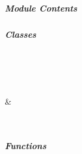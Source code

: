 \documentclass[letterpaper,10pt,english]{sphinxmanual}
\begin{document}
\subparagraph{Module Contents}
\label{\detokenize{autoapi/pine/backend/auth/bp/index:module-contents}}

\subparagraph{Classes}
\label{\detokenize{autoapi/pine/backend/auth/bp/index:classes}}

\begin{savenotes}\sphinxatlongtablestart\begin{longtable}[c]{}
\hline

\endfirsthead

%
{}\\
\hline

\endhead

\hline
{}\\
\endfoot

\endlastfoot

\sphinxAtStartPar
{\hyperref[\detokenize{autoapi/pine/backend/auth/bp/index:pine.backend.auth.bp.AuthModule}]{}}
&
\sphinxAtStartPar

\\
\hline
\end{longtable}\sphinxatlongtableend\end{savenotes}


\subparagraph{Functions}
\label{\detokenize{autoapi/pine/backend/auth/bp/index:functions}}
\end{document}
